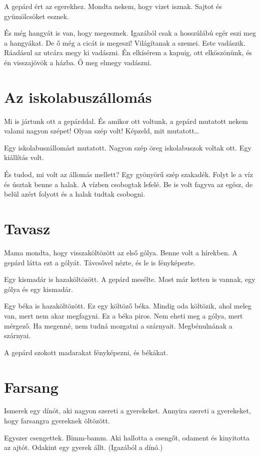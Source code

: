 \documentclass[12pt]{memoir}
\begin{document}
A gepárd ért az egerekhez. Mondta nekem, hogy vizet isznak. Sajtot és
gyümölcsöket esznek.

És még hangyát is van, hogy megesznek. Igazából csak a hosszúlábú egér eszi meg
a hangyákat. De ő még a cicát is megeszi! Világítanak a szemei. Este vadászik.
Ráadásul az utcára megy ki vadászni. Én elkísérem a kapuig, ott elköszönünk, és
én visszajövök a házba. Ő meg elmegy vadászni.


\section{Az iskolabuszállomás}
Mi is jártunk ott a gepárddal. És amikor ott voltunk, a gepárd mutatott nekem
valami nagyon szépet! Olyan szép volt! Képzeld, mit mutatott…

Egy iskolabuszállomást mutatott. Nagyon szép öreg iskolabuszok voltak ott. Egy
kiállítás volt.

És tudod, mi volt az állomás mellett? Egy gyönyörű szép szakadék. Folyt le a
víz és úsztak benne a halak. A vízben csobogtak lefelé. Be is volt fagyva az
egész, de belül azért folyott és a halak tudtak csobogni.


\section{Tavasz}
Mama mondta, hogy visszaköltözött az első gólya. Benne volt a hírekben. A
gepárd látta ezt a gólyát. Távcsővel nézte, és le is fényképezte.

Egy kismadár is hazaköltözött. A gepárd mesélte. Most már ketten is vannak, egy
gólya és egy kismadár.

Egy béka is hazaköltözött. Ez egy költöző béka. Mindig oda költözik, ahol meleg
van, mert nem akar megfagyni. Ez a béka piros. Nem eheti meg a gólya, mert
mérgező. Ha megenné, nem tudná mozgatni a szárnyait. Megbénulnának a szárnyai.

A gepárd szokott madarakat fényképezni, és békákat.


\section{Farsang}
Ismerek egy dínót, aki nagyon szereti a gyerekeket. Annyira szereti a
gyerekeket, hogy farsangra gyereknek öltözött.

Egyszer csengettek. Bimm-bamm. Aki hallotta a csengőt, odament és kinyitotta az
ajtót. Odakint egy gyerek állt. (Igazából a dínó.)
\end{document}
